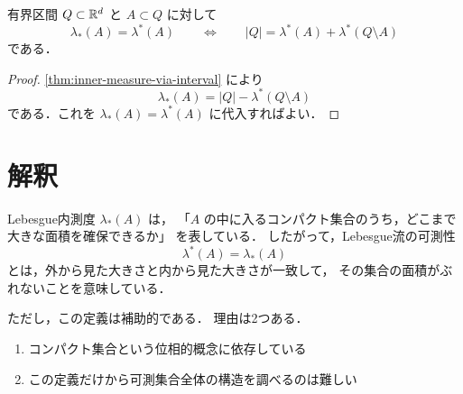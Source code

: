 \begin{corollary}[区間による外測度の分解]\label{cor:interval-outer-measure-split}
有界区間 $Q\subset\mathbb R^d$ と $A\subset Q$ に対して
\[
\lambda_*(A)=\lambda^*(A)
\qquad\Longleftrightarrow\qquad
|Q|=\lambda^*(A)+\lambda^*(Q\setminus A)
\]
である．
\end{corollary}
\begin{proof}
\cref{thm:inner-measure-via-interval} により
\[
\lambda_*(A)=|Q|-\lambda^*(Q\setminus A)
\]
である．これを $\lambda_*(A)=\lambda^*(A)$ に代入すればよい．
\end{proof}


\section{解釈}

Lebesgue内測度 $\lambda_*(A)$ は，
「$A$ の中に入るコンパクト集合のうち，どこまで大きな面積を確保できるか」
を表している．
したがって，Lebesgue流の可測性
\[
\lambda^*(A)=\lambda_*(A)
\]
とは，外から見た大きさと内から見た大きさが一致して，
その集合の面積がぶれないことを意味している．

ただし，この定義は補助的である．
理由は2つある．
\begin{enumerate}
    \item コンパクト集合という位相的概念に依存している
    \item この定義だけから可測集合全体の構造を調べるのは難しい
\end{enumerate}
